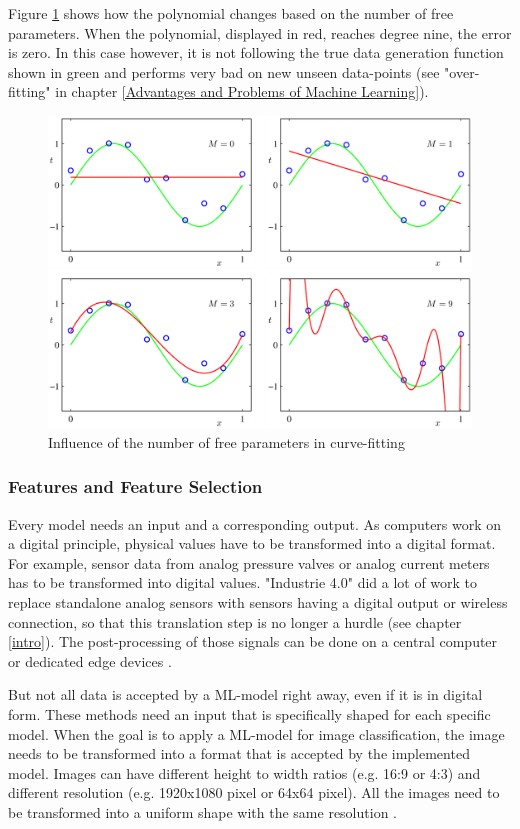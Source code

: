 Figure \ref{fig:poly} shows how the polynomial changes based on the number of free parameters. When the polynomial, displayed in red, reaches degree nine, the error is zero. In this case however, it is not following the true data generation function shown in green and performs very bad on new unseen data-points (see "over-fitting" in chapter \ref{Advantages and Problems of Machine Learning}).
\begin{figure}[H]
	\centering
	\includegraphics[width=0.8\linewidth]{IMGs/poly.png}
	\caption{Influence of the number of free parameters in curve-fitting \cite{Bishop}}
	\label{fig:poly}
\end{figure}

\subsubsection*{Features and Feature Selection}
Every model needs an input and a corresponding output. As computers work on a digital principle, physical values have to be transformed into a digital format. For example, sensor data from analog pressure valves or analog current meters has to be transformed into digital values. "Industrie 4.0" did a lot of work to replace standalone analog sensors with sensors having a digital output or wireless connection, so that this translation step is no longer a hurdle (see chapter \ref{intro}). The post-processing of those signals can be done on a central computer or dedicated edge devices \cite{Lu}.

But not all data is accepted by a ML-model right away, even if it is in digital form. These methods need an input that is specifically shaped for each specific model.
When the goal is to apply a ML-model for image classification, the image needs to be transformed into a format that is accepted by the implemented model. Images can have different height to width ratios (e.g. 16:9 or 4:3) and different resolution (e.g. 1920x1080 pixel or 64x64 pixel). All the images need to be transformed into a uniform shape with the same resolution \cite{Park}.

